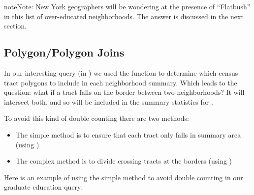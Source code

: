 \documentclass[a4paper,11pt,english]{sphinxmanual}
\begin{document}
\begin{sphinxadmonition}{note}{Note:}
New York geographers will be wondering at the presence of “Flatbush” in this list of over-educated neighborhoods. The answer is discussed in the next section.
\end{sphinxadmonition}


\subsection{Polygon/Polygon Joins}
\label{\detokenize{advanced:polygon-polygon-joins}}\label{\detokenize{advanced:polypolyjoins}}
In our interesting query (in ) we used the  function to determine which census tract polygons to include in each neighborhood summary. Which leads to the question: what if a tract falls on the border between two neighborhoods? It will intersect both, and so will be included in the summary statistics for .

\noindent{}

To avoid this kind of double counting there are two methods:
\begin{itemize}
\item {} 
The simple method is to ensure that each tract only falls in  summary area (using )

\item {} 
The complex method is to divide crossing tracts at the borders (using )

\end{itemize}

Here is an example of using the simple method to avoid double counting in our graduate education query:

\begin{sphinxVerbatim}[commandchars=\\\{\}]
        
   
  
  
  
   
   
   
 
\end{sphinxVerbatim}
\end{document}
